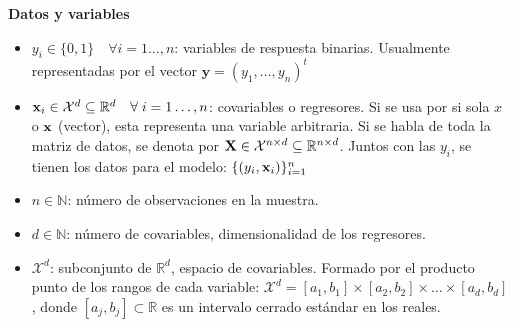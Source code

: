 \documentclass[../../Main/Main.tex]{subfiles}
\begin{document}
\textbf{Datos y variables}
\begin{itemize}[label={}]
	\item $y_i \in \{0,1\}\quad \forall i = 1\ldots,n$: variables de respuesta binarias. Usualmente representadas por el vector $\mathbf{y} = (y_1,\ldots,y_n)^t$
	\item $\mathbf{x}_i \in \mathcal{X}^d \subseteq \mathbb{R}^d\quad \forall \; i = 1\ldots,n$: covariables o regresores. Si se usa por si sola $x$ o $\mathbf{x}$ (vector), esta representa una variable arbitraria. Si se habla de toda la matriz de datos, se denota por $\mathbf{X} \in \mathcal{X}^{n\times d}\subseteq \mathbb{R}^{n\times d}$. Juntos con las $y_i$, se tienen los datos para el modelo: $\{(y_i,\mathbf{x}_i)\}_{i = 1}^n$
	\item $n \in \mathbb{N}$: número de observaciones en la muestra. 
	\item $d \in \mathbb{N}$: número de covariables, dimensionalidad de los regresores. 
	\item $\mathcal{X}^d$: subconjunto de $\mathbb{R}^d$, espacio de covariables. Formado por el producto punto de los rangos de cada variable: $\mathcal{X}^d = [a_1,b_1]\times[a_2,b_2]\times\ldots\times[a_d,b_d]$, donde $[a_j,b_j] \subset \mathbb{R}$ es un intervalo cerrado estándar en los reales. 
\end{itemize}
\end{document}
